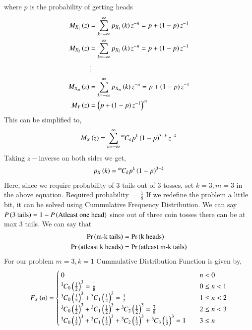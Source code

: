 \documentclass[journal]{IEEEtran}
\begin{document}
where $p$ is the probability of getting heads
\begin{align}
  M_{X_1}\left(z\right)&=\sum_{k=-\infty}^{\infty}p_{X_1}\left(k\right)z^{-n} = p + \left(1-p\right)z^{-1}\\
  M_{X_2}\left(z\right)&=\sum_{k=-\infty}^{\infty}p_{X_2}\left(k\right)z^{-n} = p + \left(1-p\right)z^{-1}\\
  &\vdots\\
  M_{X_m}\left(z\right)&=\sum_{k=-\infty}^{\infty}p_{X_m}\left(k\right)z^{-n} = p + \left(1-p\right)z^{-1}\\   M_Y\left(z\right) &= \left(p + \left(1-p\right)z^{-1}\right)^{m}
\end{align}
This can be simplified to,
\begin{align}
  M_X\left(z\right) = \sum_{n=-\infty}^{\infty} {{}^{m}\mkern-1muC_{k}}p^{k}\left(1-p\right)^{3-k}z^{-k}
\end{align}
Taking $z-$inverse on both sides we get,
\begin{align}
  p_X\left(k\right) = {{}^{m}\mkern-1muC_{k}} p^{k} \left(1-p\right)^{3-k} 
\end{align}
Here, since we require probability of $3$ tails out of $3$ tosses, set $k=3, m=3$ in the above equation.\newline
Required probability $=\frac{1}{8}$\newline
If we redefine the problem a little bit, it can be solved using Cummulative Frequency Distribution. We can say $P\left(\text{3 tails}\right) = 1 - P\left(\text{Atleast one head}\right)$ since out of three coin tosses there can be at max $3$ tails.\newline
We can say that 
\begin{align}
  \Pr\left(\text{m-k tails}\right) &= \Pr\left(\text{k heads}\right)\\
  \Pr\left(\text{atleast k heads}\right) &= \Pr\left(\text{atleast m-k tails}\right)
\end{align}
For our problem $m=3, k=1$
Cummulative Distribution Function is given by,
\begin{align}
    F_{X}\left(n\right) = \begin{cases}
        0 & \quad n < 0\\
        {{}^{3}\mkern-1muC_{0}}\left(\frac{1}{2}\right)^3 = \frac{1}{8} & \quad 0 \leq n < 1\\
        {{}^{3}\mkern-1muC_{0}}\left(\frac{1}{2}\right)^3 + {{}^{3}\mkern-1muC_{1}}\left(\frac{1}{2}\right)^3 = \frac{1}{2} & \quad 1 \leq n < 2\\
        {{}^{3}\mkern-1muC_{0}}\left(\frac{1}{2}\right)^3 + {{}^{3}\mkern-1muC_{1}}\left(\frac{1}{2}\right)^3 + {{}^{3}\mkern-1muC_{2}}\left(\frac{1}{2}\right)^3 = \frac{7}{8} & \quad 2 \leq n < 3\\
        {{}^{3}\mkern-1muC_{0}}\left(\frac{1}{2}\right)^3 + {{}^{3}\mkern-1muC_{1}}\left(\frac{1}{2}\right)^3 + {{}^{3}\mkern-1muC_{2}}\left(\frac{1}{2}\right)^3 + {{}^{3}\mkern-1muC_{3}}\left(\frac{1}{2}\right)^3 = 1 & \quad 3 \leq n
    \end{cases}
\end{align}
\end{document}
